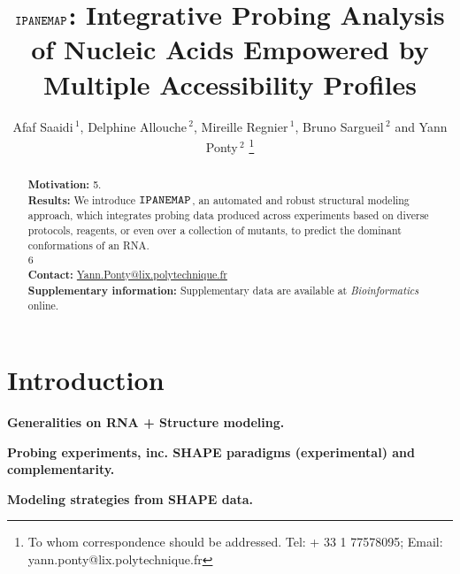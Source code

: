 \documentclass[a4,center,fleqn]{NAR}
\newcommand{\Software}[1]{$\text{\ttfamily #1}$}
\newcommand{\OurTool}{\Software{IPANEMAP}\xspace}
\newcommand{\Blabla}[1][5-6]{{\color{blue!40!white}\lipsum*[#1]}}
\begin{document}
\title{\OurTool{}:  Integrative Probing Analysis of Nucleic Acids Empowered by Multiple Accessibility Profiles}
\author{%
Afaf Saaidi\,$^{1}$,
Delphine Allouche\,$^{2}$,
Mireille Regnier\,$^{1}$,
Bruno Sargueil\,$^{2}$
and Yann Ponty\,$^2$%
\footnote{To whom correspondence should be addressed.
Tel: + 33 1 77578095; Email: yann.ponty@lix.polytechnique.fr}}


\address{%
$^{1}$CNRS UMR 7161, LIX, Ecole Polytechnique, France
and
$^{2}$CNRS UMR 8015, Laboratoire de cristallographie et RMN Biologiques, University Paris Descartes, France}


\maketitle

\begin{abstract}
\textbf{Motivation:} \Blabla{5}.\\
\textbf{Results:} We introduce \OurTool{}, an automated and robust structural modeling approach, which integrates probing data produced across experiments based on diverse protocols, reagents, or even over a collection of mutants, to predict the dominant conformations of an RNA. \\
\Blabla{6}
\\
\textbf{Contact:} \href{yann.ponty@lix.polytechnique.fr}{Yann.Ponty@lix.polytechnique.fr}\\
\textbf{Supplementary information:} Supplementary data are available at \textit{Bioinformatics}
online.
\end{abstract}



\section{Introduction}

{\noindent\bf Generalities on RNA + Structure modeling.}
\Blabla[1-2]


{\noindent\bf Probing experiments, inc. SHAPE paradigms (experimental) and complementarity.}
\Blabla[3-4]

{\noindent\bf Modeling strategies from SHAPE data.}
\end{document}
